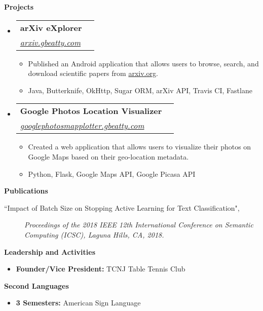 \documentclass[letterpaper,10pt]{article}
\makeatletter
\newcommand{\resitem}[1]{\item #1 \vspace{-2pt}}
\newcommand{\resheading}[1]{{\large \colorbox{mygrey}{\begin{minipage}{\textwidth}{\textbf{#1 \vphantom{p\^{E}}}}\end{minipage}}}}
\newcommand{\ressubheading}[4]{
\begin{tabular*}{7.0in}{l@{\extracolsep{\fill}}r}
		\textbf{#1} & #2 \\
		\textit{#3} & \textit{#4} \\
\end{tabular*}\vspace{-6pt}}
\makeatother
\begin{document}
\resheading{Projects}
\begin{itemize}
\item
	\ressubheading{arXiv eXplorer}{}{\href{http://arxiv.gbeatty.com}{arxiv.gbeatty.com}}{}
	\begin{itemize}
		\resitem{Published an Android application that allows users to browse, search, and download scientific papers from \href{http://arxiv.org}{arxiv.org}.}
		\resitem{Java, Butterknife, OkHttp, Sugar ORM, arXiv API, Travis CI, Fastlane}
	\end{itemize}

\item
	\ressubheading{Google Photos Location Visualizer}{}{\href{http://googlephotosmapplotter.gbeatty.com}{googlephotosmapplotter.gbeatty.com}}{}
	\begin{itemize}
		\resitem{Created a web application that allows users to visualize their photos on Google Maps based on their geo-location metadata.}
		\resitem{Python, Flask, Google Maps API, Google Picasa API}
	\end{itemize}

\end{itemize}

\resheading{Publications}
\begin{description}
\item[``Impact of Batch Size on Stopping Active Learning for Text Classification",]
\emph{Proceedings of the 2018 IEEE 12th International Conference on Semantic Computing (ICSC), Laguna Hills, CA, 2018.}
\end{description}
\resheading{Leadership and Activities}
	\begin{itemize}
	\resitem{\textbf{Founder/Vice President:} TCNJ Table Tennis Club}
	\end{itemize}
\resheading{Second Languages}
	\begin{itemize}
	\resitem{\textbf{3 Semesters:} American Sign Language}
	\end{itemize}
\end{document}
